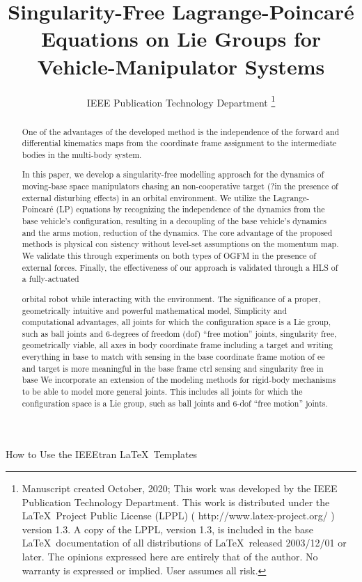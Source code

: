 \documentclass[lettersize,journal]{IEEEtran}
\theoremstyle{remark}
\begin{document}
\title{Singularity-Free Lagrange-Poincar\'{e} Equations on Lie Groups for Vehicle-Manipulator Systems}
\author{IEEE Publication Technology Department
\thanks{Manuscript created October, 2020; This work was developed by the IEEE Publication Technology Department. This work is distributed under the \LaTeX \ Project Public License (LPPL) ( http://www.latex-project.org/ ) version 1.3. A copy of the LPPL, version 1.3, is included in the base \LaTeX \ documentation of all distributions of \LaTeX \ released 2003/12/01 or later. The opinions expressed here are entirely that of the author. No warranty is expressed or implied. User assumes all risk.}}

%
{How to Use the IEEEtran \LaTeX \ Templates}

\maketitle

\begin{abstract}
One of the advantages of the developed method is the independence of the forward and differential kinematics maps from the coordinate frame assignment to the intermediate bodies in the multi-body system.


In this paper, we develop a singularity-free modelling approach for the dynamics of moving-base space manipulators chasing an non-cooperative target (?in the presence of external disturbing effects) in an orbital environment. We utilize the Lagrange-Poincar\'{e} (LP) equations by recognizing the independence of the dynamics from the base vehicle's configuration, resulting in a decoupling of the base vehicle's dynamics and the arms motion, reduction of the dynamics.%
The core advantage of the proposed methods is physical con
sistency without level-set assumptions on the momentum map.
We validate this through experiments on both types of OGFM
in the presence of external forces. Finally, the effectiveness of
our approach is validated through a HLS of a fully-actuated

orbital robot while interacting with the environment.
The significance of a proper, geometrically intuitive and powerful mathematical model, Simplicity and computational advantages,
all joints for which the configuration space is a Lie group, such as ball joints and 6-degrees of freedom (dof) “free motion” joints, singularity free,
geometrically viable, all axes in body coordinate frame
including a target and writing everything in base to match with sensing in the base coordinate frame
motion of ee and target is more meaningful in the base frame
ctrl sensing and singularity free in base
We incorporate an extension of the modeling methods for rigid-body mechanisms to be able to model more general joints.
This includes all joints for which the configuration space is a Lie group, such as ball joints and 6-dof “free
motion” joints.
\end{abstract}
\end{document}
